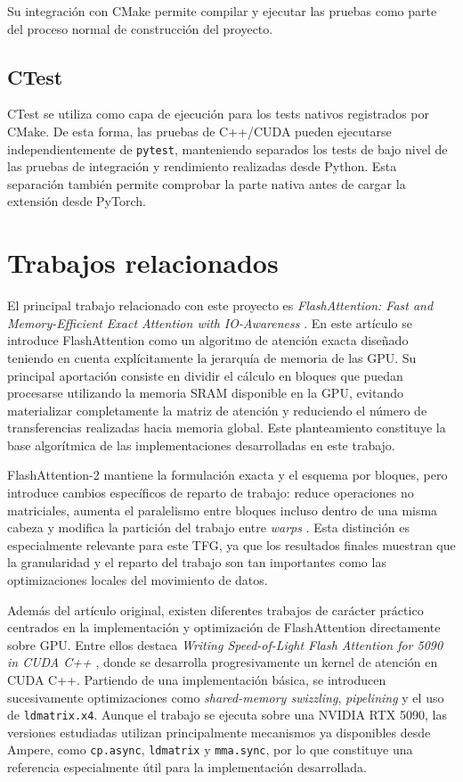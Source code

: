 Su integración con CMake permite compilar y ejecutar las pruebas como parte del proceso normal de construcción del proyecto.

\subsection{CTest}

CTest se utiliza como capa de ejecución para los tests nativos registrados por CMake. De esta forma, las pruebas de C++/CUDA pueden ejecutarse independientemente de \texttt{pytest}, manteniendo separados los tests de bajo nivel de las pruebas de integración y rendimiento realizadas desde Python. Esta separación también permite comprobar la parte nativa antes de cargar la extensión desde PyTorch.


\section{Trabajos relacionados}

El principal trabajo relacionado con este proyecto es \textit{FlashAttention: Fast and Memory-Efficient Exact Attention with IO-Awareness} \cite{dao2022flashattention}. En este artículo se introduce FlashAttention como un algoritmo de atención exacta diseñado teniendo en cuenta explícitamente la jerarquía de memoria de las GPU. Su principal aportación consiste en dividir el cálculo en bloques que puedan procesarse utilizando la memoria SRAM disponible en la GPU, evitando materializar completamente la matriz de atención y reduciendo el número de transferencias realizadas hacia memoria global. Este planteamiento constituye la base algorítmica de las implementaciones desarrolladas en este trabajo.

FlashAttention-2 mantiene la formulación exacta y el esquema por bloques, pero introduce cambios específicos de reparto de trabajo: reduce operaciones no matriciales, aumenta el paralelismo entre bloques incluso dentro de una misma cabeza y modifica la partición del trabajo entre \textit{warps} \cite{dao2023flashattention2}. Esta distinción es especialmente relevante para este TFG, ya que los resultados finales muestran que la granularidad y el reparto del trabajo son tan importantes como las optimizaciones locales del movimiento de datos.

Además del artículo original, existen diferentes trabajos de carácter práctico centrados en la implementación y optimización de FlashAttention directamente sobre GPU. Entre ellos destaca \textit{Writing Speed-of-Light Flash Attention for 5090 in CUDA C++} \cite{gaunernstFlashAttention}, donde se desarrolla progresivamente un kernel de atención en CUDA C++. Partiendo de una implementación básica, se introducen sucesivamente optimizaciones como \textit{shared-memory swizzling}, \textit{pipelining} y el uso de \texttt{ldmatrix.x4}. Aunque el trabajo se ejecuta sobre una NVIDIA RTX 5090, las versiones estudiadas utilizan principalmente mecanismos ya disponibles desde Ampere, como \texttt{cp.async}, \texttt{ldmatrix} y \texttt{mma.sync}, por lo que constituye una referencia especialmente útil para la implementación desarrollada.


